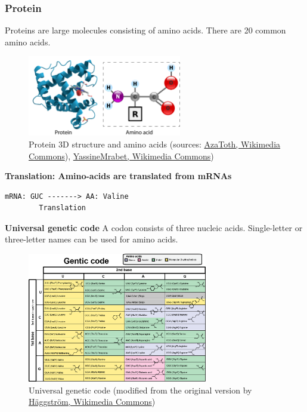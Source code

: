 %
%
\subsubsection*{Protein}
Proteins are large molecules consisting of amino acids. There are 20 common amino acids.
 
\begin{figure}[H]
  \centering
      \includegraphics[width=0.6\textwidth]{fig01/protein_and_amino_acid.png}
  \caption{Protein 3D structure and amino acids (sources: \href{https://en.wikipedia.org/wiki/Protein\#/media/File:Myoglobin.png}{AzaToth, Wikimedia Commons}), \href{https://en.wikipedia.org/wiki/Amino_acid\#/media/File:AminoAcidball.svg}{YassineMrabet, Wikimedia Commons})}
\end{figure}

\noindent \textbf{Translation: Amino-acids are translated from mRNAs}

\begin{verbatim}
mRNA: GUC -------> AA: Valine
        Translation
\end{verbatim}

\newpage 

\noindent \textbf{Universal genetic code}
A codon consists of three nucleic acids. Single-letter or three-letter names can be used for amino acids.

\begin{figure}[H]
  \centering
      \includegraphics[width=0.7\textwidth]{fig01/genetic_code.png}
  \caption{Universal genetic code (modified from the original version by \href{https://commons.wikimedia.org/wiki/File\%3ANotable_mutations.svg}{H\"aggstr\"om, Wikimedia Commons})}
\end{figure}

